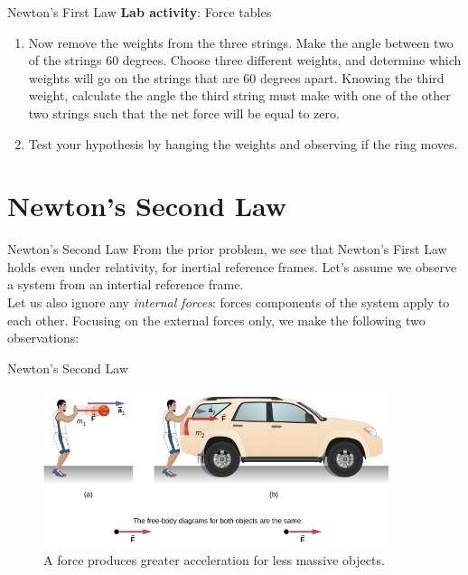 \documentclass{beamer}
\begin{document}
\begin{frame}{Newton's First Law}
\small
\textbf{Lab activity}: Force tables
\begin{enumerate}
\item Now remove the weights from the three strings.  Make the angle between two of the strings 60 degrees.  Choose three different weights, and determine which weights will go on the strings that are 60 degrees apart.  Knowing the third weight, calculate the angle the third string must make with one of the other two strings such that the net force will be equal to zero.
\item Test your hypothesis by hanging the weights and observing if the ring moves.
\end{enumerate}
\end{frame}

\section{Newton's Second Law}

\begin{frame}{Newton's Second Law}
From the prior problem, we see that \alert{Newton's First Law} holds even under relativity, for inertial reference frames.  Let's assume we observe a system from an intertial reference frame. \\
\vspace{0.5cm}
Let us also ignore any \textit{internal forces}: forces components of the system apply to each other.  Focusing on the external forces only, we make the following two observations: \\
\end{frame}

\begin{frame}{Newton's Second Law}
\begin{figure}
\centering
\includegraphics[width=0.9\textwidth]{figures/NewtonsSecond.png}
\caption{\label{fig:newton1} A force produces greater acceleration for less massive objects.}
\end{figure}
\end{frame}
\end{document}

